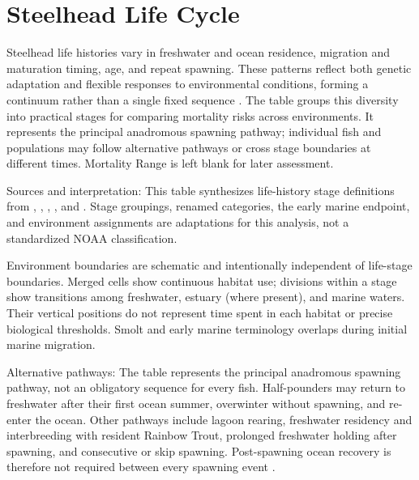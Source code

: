 \section{Steelhead Life Cycle}
\label{sec:life-cycle}
Steelhead life histories vary in freshwater and ocean residence, migration and maturation timing, age, and repeat spawning. These patterns reflect both genetic adaptation and flexible responses to environmental conditions, forming a continuum rather than a single fixed sequence \parencite[pp.~791--792]{myers2018steelhead}. The table groups this diversity into practical stages for comparing mortality risks across environments. It represents the principal anadromous spawning pathway; individual fish and populations may follow alternative pathways or cross stage boundaries at different times. Mortality Range is left blank for later assessment.


\begin{table}[p]
\centering
\caption{Steelhead Life Stages and Environments}
\label{tab:life-stage-environments}
\makebox[\textwidth][c]{%
\begin{minipage}{7.3in}

\end{minipage}%
}
\end{table}
\clearpage
Sources and interpretation: This table synthesizes life-history stage definitions from \textcite{blanton2011foundations}, \textcite{nmfsodfw2011uwr}, \textcite{nmfs2019puget}, \textcite{noaaGlossary}, and \textcite{myers2018steelhead}. Stage groupings, renamed categories, the early marine endpoint, and environment assignments are adaptations for this analysis, not a standardized NOAA classification.

Environment boundaries are schematic and intentionally independent of life-stage boundaries. Merged cells show continuous habitat use; divisions within a stage show transitions among freshwater, estuary (where present), and marine waters. Their vertical positions do not represent time spent in each habitat or precise biological thresholds. Smolt and early marine terminology overlaps during initial marine migration.

Alternative pathways: The table represents the principal anadromous spawning pathway, not an obligatory sequence for every fish. Half-pounders may return to freshwater after their first ocean summer, overwinter without spawning, and re-enter the ocean. Other pathways include lagoon rearing, freshwater residency and interbreeding with resident Rainbow Trout, prolonged freshwater holding after spawning, and consecutive or skip spawning. Post-spawning ocean recovery is therefore not required between every spawning event \parencite[pp.~781--782, 792, 798, 820, 852--855]{myers2018steelhead}.

